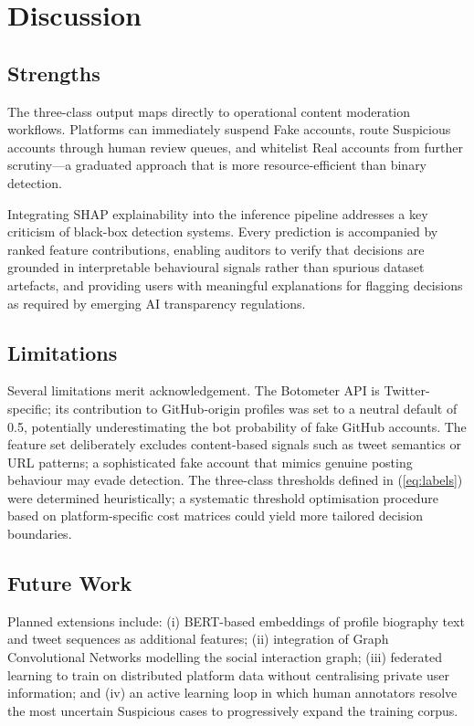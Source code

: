 \documentclass[conference]{IEEEtran}
\begin{document}
\section{Discussion}
\label{sec:discussion}

\subsection{Strengths}

The three-class output maps directly to operational content moderation
workflows. Platforms can immediately suspend Fake accounts, route
Suspicious accounts through human review queues, and whitelist Real
accounts from further scrutiny---a graduated approach that is more
resource-efficient than binary detection.

Integrating SHAP explainability into the inference pipeline addresses a
key criticism of black-box detection systems. Every prediction is
accompanied by ranked feature contributions, enabling auditors to verify
that decisions are grounded in interpretable behavioural signals rather
than spurious dataset artefacts, and providing users with meaningful
explanations for flagging decisions as required by emerging AI
transparency regulations.

\subsection{Limitations}

Several limitations merit acknowledgement. The Botometer API is
Twitter-specific; its contribution to GitHub-origin profiles was set to a
neutral default of 0.5, potentially underestimating the bot probability
of fake GitHub accounts. The feature set deliberately excludes
content-based signals such as tweet semantics or URL patterns; a
sophisticated fake account that mimics genuine posting behaviour may
evade detection. The three-class thresholds defined in
(\ref{eq:labels}) were determined heuristically; a systematic
threshold optimisation procedure based on platform-specific cost matrices
could yield more tailored decision boundaries.

\subsection{Future Work}

Planned extensions include: (i) BERT-based embeddings of profile
biography text and tweet sequences as additional features; (ii)
integration of Graph Convolutional Networks modelling the social
interaction graph; (iii) federated learning to train on distributed
platform data without centralising private user information; and (iv) an
active learning loop in which human annotators resolve the most uncertain
Suspicious cases to progressively expand the training corpus.
\end{document}
